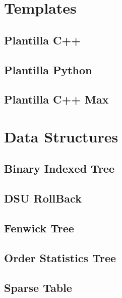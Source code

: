 \section{Templates}
\subsection{Plantilla C++}
\raggedbottom
\hrulefill
\subsection{Plantilla Python}
\raggedbottom
\hrulefill
\subsection{Plantilla C++ Max}
\raggedbottom
\hrulefill
\newpage

\section{Data Structures}
\subsection{Binary Indexed Tree}
\raggedbottom
\hrulefill
\subsection{DSU RollBack}
\raggedbottom
\hrulefill
\subsection{Fenwick Tree}
\raggedbottom
\hrulefill
\subsection{Order Statistics Tree}
\raggedbottom
\hrulefill
\subsection{Sparse Table}
\raggedbottom
\hrulefill
